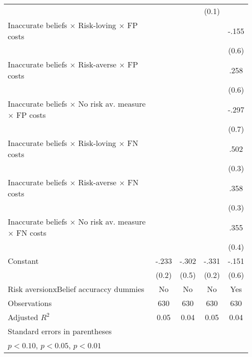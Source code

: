 \begin{table}[htbp]
\begin{tabular}{l*{4}{c}}
                &                  &                  &    (0.1)         &                  \\
Inaccurate beliefs $\times$ Risk-loving $\times$ FP costs&                  &                  &                  &    -.155         \\
                &                  &                  &                  &    (0.6)         \\
Inaccurate beliefs $\times$ Risk-averse $\times$ FP costs&                  &                  &                  &     .258         \\
                &                  &                  &                  &    (0.6)         \\
Inaccurate beliefs $\times$ No risk av. measure $\times$ FP costs&                  &                  &                  &    -.297         \\
                &                  &                  &                  &    (0.7)         \\
Inaccurate beliefs $\times$ Risk-loving $\times$ FN costs&                  &                  &                  &     .502         \\
                &                  &                  &                  &    (0.3)         \\
Inaccurate beliefs $\times$ Risk-averse $\times$ FN costs&                  &                  &                  &     .358         \\
                &                  &                  &                  &    (0.3)         \\
Inaccurate beliefs $\times$ No risk av. measure $\times$ FN costs&                  &                  &                  &     .355         \\
                &                  &                  &                  &    (0.4)         \\
Constant        &    -.233         &    -.302         &    -.331         &    -.151         \\
                &    (0.2)         &    (0.5)         &    (0.2)         &    (0.6)         \\
Risk aversionxBelief accuraccy dummies &       No         &       No         &       No         &      Yes         \\
\hline
Observations    &      630         &      630         &      630         &      630         \\
Adjusted \(R^{2}\)&     0.05         &     0.04         &     0.05         &     0.04         \\
\hline\hline
\multicolumn{5}{l}{\footnotesize Standard errors in parentheses}\\
\multicolumn{5}{l}{\footnotesize \sym{*} \(p<0.10\), \sym{**} \(p<0.05\), \sym{***} \(p<0.01\)}\\
\end{tabular}
\end{table}
